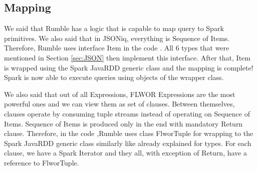 \subsection{Mapping}
We said that Rumble has a logic that is capable to map query to Spark primitives. We also said that in JSONiq, everything is Sequence of Items. Therefore, Rumble uses interface Item in the code \cite{RumbleRepository}. All 6 types that were mentioned in Section \ref{sec:JSON} then implement this interface. After that, Item is wrapped using the Spark JavaRDD generic class and the mapping is complete! Spark is now able to execute queries using objects of the wrapper class.

We also said that out of all Expressions, FLWOR Expressions are the most powerful ones and we can view them as set of clauses. Between themselves, clauses operate by consuming tuple streams instead of operating on Sequence of Items. Sequence of Items is produced only in the end with mandatory Return clause. Therefore, in the code \cite{RumbleRepository},Rumble uses class FlworTuple for wrapping to the Spark JavaRDD generic class similarly like already explained for types. For each clause, we have a Spark Iterator and they all, with exception of Return, have a reference to FlworTuple. 

